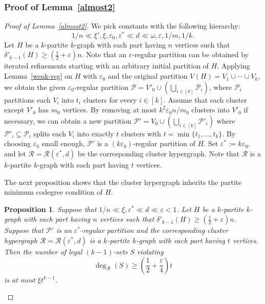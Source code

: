 \documentclass[11pt,a4paper]{article}
\newtheorem{prop}[thm]{Proposition}
\theoremstyle{definition}
\begin{document}
\subsubsection{Proof of Lemma~\ref{almost2}}
\begin{proof}[Proof of Lemma~\ref{almost2}]
We pick constants with the following hierarchy:
$$1/n \ll \xi', \xi, \varepsilon_0, \varepsilon^*\ll d\ll \omega, \varepsilon, 1/m, 1/k.$$
Let $H$ be a $k$-partite $k$-graph with each part having $n$ vertices such that $\delta'_{k-1}(H)\geq (\frac{1}{2}+\varepsilon)n$. Note that an $\varepsilon$-regular partition can be obtained by iterated refinements starting with an arbitrary initial partition of $H$. Applying Lemma~\ref{weak-reg} on $H$ with $\varepsilon_0$ and the original partition $V(H)=V_1\cup \cdots \cup V_k$, we obtain the given $\varepsilon_0$-regular partition $\mathcal{P}=V'_0\cup (\bigcup _{i\in [k]}\mathcal{P}_i)$, where $\mathcal{P}_i$ partitions each $V_i$ into $t_i$ clusters for every $i\in [k]$. Assume that each cluster except $V'_0$ has $m_0$ vertices. By removing at most $k^2\varepsilon_0 n/m_0$ clusters into $V'_0$ if necessary, we can obtain a new partition $\mathcal{P}'=V_0\cup (\bigcup _{i\in [k]}\mathcal{P}'_i)$ where $\mathcal{P}'_i\subseteq \mathcal{P}_i$ splits each $V_i$ into exactly $t$ clusters with $t=\min\{t_1,\dots,t_k\}$. By choosing $\varepsilon_0$ small enough, $\mathcal{P}'$ is a $(k\varepsilon_0)$-regular partition of $H$. Set $\varepsilon^*:=k\varepsilon_0$, and let $\mathcal{R}=\mathcal{R}(\varepsilon^*,d)$ be the corresponding cluster hypergraph. Note that $\mathcal{R}$ is a $k$-partite $k$-graph with each part having $t$ vertices.

The next proposition shows that the cluster hypergraph inherits the partite minimum codegree condition of $H$.

\begin{prop}\label{inherit}
 Suppose that $1/n \ll \xi ,\varepsilon^* \ll d\ll \varepsilon<1$. Let $H$ be a $k$-partite $k$-graph with each part having $n$ vertices such that $\delta'_{k-1}(H)\geq (\frac{1}{2}+\varepsilon)n$. Suppose that $\mathcal{P'}$ is an $\varepsilon^*$-regular partition and the corresponding cluster hypergraph $\mathcal{R}=\mathcal{R}(\varepsilon^*,d)$ is a $k$-partite $k$-graph with each part having $t$ vertices. Then the number of legal $(k-1)$-sets $S$ violating 
$$\deg_{\mathcal{R}}(S)\geq (\frac{1}{2}+\frac{\varepsilon}{4})t$$
is at most $\xi t^{k-1}$.

\end{prop}


\end{proof}
\end{document}
